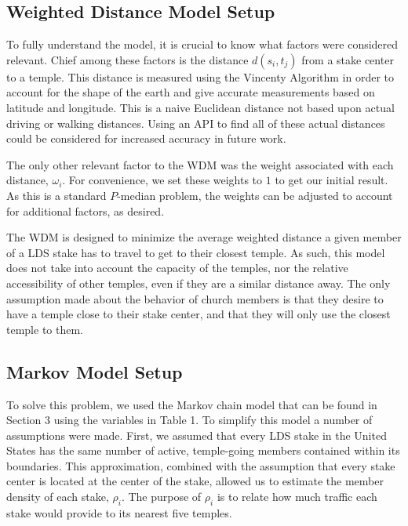 \documentclass[twoside,twocolumn]{article}
\begin{document}
\subsection{Weighted Distance Model Setup}

To fully understand the model, it is crucial to know what factors were considered relevant.
Chief among these factors is the distance $d(s_i,t_j)$ from a stake center to a temple. %
This distance is measured using the Vincenty Algorithm in order to account for the shape of the earth and give accurate measurements based on latitude and longitude. %
This is a naive Euclidean distance not based upon actual driving or walking distances.
Using an API to find all of these actual distances could be considered for increased accuracy in future work.

The only other relevant factor to the WDM was the weight associated with each distance, $\omega_i$. %
For convenience, we set these weights to $1$ to get our initial result.
As this is a standard $P$-median problem, the weights can be adjusted to account for additional factors, as desired.

The WDM is designed to minimize the average weighted distance a given member of a LDS stake has to travel to get to their closest temple.
As such, this model does not take into account the capacity of the temples, nor the relative accessibility of other temples, even if they are a similar distance away.
The only assumption made about the behavior of church members is that they desire to have a temple close to their stake center, and that they will only use the closest temple to them. %

\subsection{Markov Model Setup}

To solve this problem, we used the Markov chain model that can be found in Section 3 using the variables in Table 1.
To simplify this model a number of assumptions were made.
First, we assumed that every LDS stake in the United States has the same number of active, temple-going members contained within its boundaries.
This approximation, combined with the assumption that every stake center is located at the center of the stake, allowed us to estimate the member density of each stake, $\rho_i$.
The purpose of $\rho_{i}$ is to relate how much traffic each stake would provide to its nearest five temples. %
\end{document}

